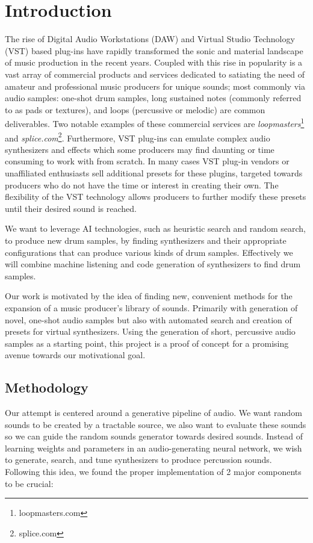 \documentclass[\main/thesis.tex]{subfiles}
\begin{document}
\chapter{Introduction}
The rise of Digital Audio Workstations (DAW) \cite{leider2004digital} and Virtual Studio Technology (VST) based plug-ins \cite{tanev2013virtual} have rapidly transformed the sonic and material landscape of music production in the recent years. Coupled with this rise in popularity is a vast array of commercial products and services dedicated to satiating the need of amateur and professional music producers for unique sounds; most commonly via audio samples: one-shot drum samples, long sustained notes (commonly referred to as pads or textures), and loops (percussive or melodic) are common deliverables. Two notable examples of these commercial services are \textit{loopmasters}\footnote{loopmasters.com} and \textit{splice.com}\footnote{splice.com}. Furthermore, VST plug-ins can emulate complex audio synthesizers and effects which some producers may find daunting or time consuming to work with from scratch. In many cases VST plug-in vendors or unaffiliated enthusiasts sell additional presets for these plugins, targeted towards producers who do not have the time or interest in creating their own. The flexibility of the VST technology allows producers to further modify these presets until their desired sound is reached.

We want to leverage AI technologies, such as heuristic search and random search, to produce new drum samples, by finding synthesizers and their appropriate configurations that can produce various kinds of drum samples. Effectively we will combine machine listening and code generation of synthesizers to find drum samples.

Our work is motivated by the idea of finding new, convenient methods for the expansion of a music producer's library of sounds. Primarily with generation of novel, one-shot audio samples but also with automated search and creation of presets for virtual synthesizers. Using the generation of short, percussive audio samples as a starting point, this project is a proof of concept for a promising avenue towards our motivational goal.


\section{Methodology}
Our attempt is centered around a generative pipeline of audio. We want random sounds to be created by a tractable source, we also want to evaluate these sounds so we can guide the random sounds generator towards desired sounds. Instead of learning weights and parameters in an audio-generating neural network, we wish to generate, search, and tune synthesizers to produce percussion sounds. Following this idea, we found the proper implementation of 2 major components to be crucial:
\end{document}
